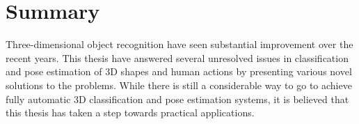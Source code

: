 
\section{Summary}
Three-dimensional object recognition have seen substantial improvement over the recent years.
This thesis have answered several unresolved issues in classification and pose estimation of 3D shapes and human actions by presenting various novel solutions to the problems. While there is still a considerable way to go to achieve fully automatic 3D classification and pose estimation systems, it is believed that this thesis has taken a step towards practical applications. 
